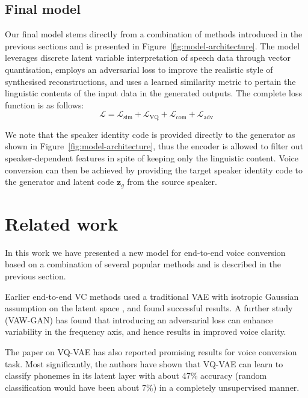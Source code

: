 \documentclass{article}
\DeclareMathOperator{\VQ}{VQ}
\begin{document}
\subsection{Final model}
Our final model stems directly from a combination of methods introduced in the previous sections and is presented in Figure~\ref{fig:model-architecture}. The model leverages discrete latent variable interpretation of speech data through vector quantisation, employs an adversarial loss to improve the realistic style of synthesised reconstructions, and uses a learned similarity metric to pertain the linguistic contents of the input data in the generated outputs. The complete loss function is as follows:
\begin{equation}
    \mathcal{L} = \mathcal{L}_{\text{sim}} + \mathcal{L}_{\VQ} + \mathcal{L}_{\text{com}} + \mathcal{L}_{\text{adv}}
\end{equation}

We note that the speaker identity code is provided directly to the generator as shown in Figure~\ref{fig:model-architecture}, thus the encoder is allowed to filter out speaker-dependent features in spite of keeping only the linguistic content. Voice conversion can then be achieved by providing the target speaker identity code to the generator and latent code $\mathbf{z}_g$ from the source speaker.


\section{Related work}
\label{sec:related-work}
In this work we have presented a new model for end-to-end voice conversion based on a combination of several popular methods and is described in the previous section.

Earlier end-to-end VC methods used a traditional VAE with isotropic Gaussian assumption on the latent space \citep{Hsu2016}, and found successful results. A further study (VAW-GAN) \citep{Hsu2017} has found that introducing an adversarial loss can enhance variability in the frequency axis, and hence results in improved voice clarity. 

The paper on VQ-VAE \citep{VandenOord2017} has also reported promising results for voice conversion task. Most significantly, the authors have shown that VQ-VAE can learn to classify phonemes in its latent layer with about 47\% accuracy (random classification would have been about 7\%) in a completely unsupervised manner.
\end{document}
